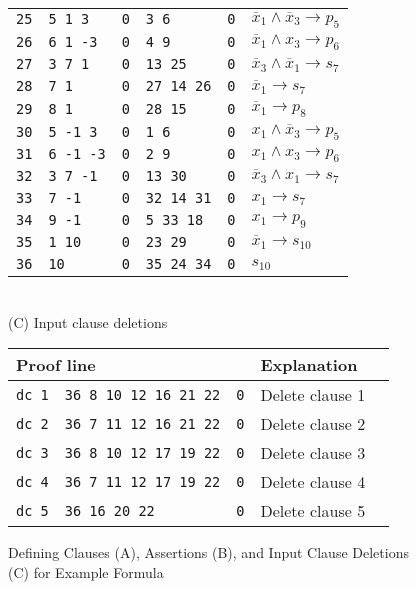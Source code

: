 \documentclass[letterpaper,USenglish,cleveref, autoref, thm-restate]{lipics-v2021}
\newcommand{\obar}[1]{\overline{#1}}
\begin{document}
\begin{figure}
\begin{minipage}{0.49\textwidth}
\begin{tabular}{llllll}
\midrule
\texttt{25} & \texttt{5 1 3} & \texttt{0} & \texttt{3 6} & \texttt{0} & $\obar{x}_1 \land \obar{x}_3 \rightarrow p_5$ \\
\texttt{26} & \texttt{6 1 -3} & \texttt{0} & \texttt{4 9} & \texttt{0} & $\obar{x}_1 \land x_3 \rightarrow p_6$ \\
\texttt{27} & \texttt{3 7 1} & \texttt{0} & \texttt{13 25} & \texttt{0} & $\obar{x}_3 \land \obar{x}_1 \rightarrow s_7$  \\
\texttt{28} & \texttt{7 1} & \texttt{0} & \texttt{27 14 26} & \texttt{0} & $\obar{x}_1 \rightarrow s_7$  \\
\texttt{29} & \texttt{8 1} & \texttt{0} & \texttt{28 15} & \texttt{0} & $\obar{x}_1 \rightarrow p_8$  \\
\texttt{30} & \texttt{5 -1 3} & \texttt{0} & \texttt{1 6} & \texttt{0} & $x_1 \land \obar{x}_3 \rightarrow p_5$ \\
\texttt{31} & \texttt{6 -1 -3} & \texttt{0} & \texttt{2 9} & \texttt{0} & $x_1 \land x_3 \rightarrow p_6$ \\
\texttt{32} & \texttt{3 7 -1} & \texttt{0} & \texttt{13 30} & \texttt{0} & $\obar{x}_3 \land x_1 \rightarrow s_7$  \\
\texttt{33} & \texttt{7 -1} & \texttt{0} & \texttt{32 14 31} & \texttt{0} & $x_1 \rightarrow s_7$  \\
\texttt{34} & \texttt{9 -1} & \texttt{0} & \texttt{5 33 18} & \texttt{0} & $x_1 \rightarrow p_9$  \\
\texttt{35} & \texttt{1 10} & \texttt{0} & \texttt{23 29} & \texttt{0} & $\obar{x}_1 \rightarrow s_{10}$  \\
\texttt{36} & \texttt{10} & \texttt{0} & \texttt{35 24 34} & \texttt{0} & $s_{10}$ \\
\bottomrule
\end{tabular}
\\[1.2ex]
(C) Input clause deletions\\[1.2ex]
\begin{tabular}{lllll}
  \toprule
 \multicolumn{3}{l}{Proof line} & Explanation\\
\midrule
 \texttt{dc 1} & \texttt{36 8 10 12 16 21 22} & \texttt{0} & Delete clause 1 \\
 \texttt{dc 2} & \texttt{36 7 11 12 16 21 22} & \texttt{0} & Delete clause 2 \\
 \texttt{dc 3} & \texttt{36 8 10 12 17 19 22} & \texttt{0} & Delete clause 3 \\
 \texttt{dc 4} & \texttt{36 7 11 12 17 19 22} & \texttt{0} & Delete clause 4 \\
 \texttt{dc 5} & \texttt{36 16 20 22} & \texttt{0} &  Delete clause 5 \\
\end{tabular}
\end{minipage}
\caption{Defining Clauses (A), Assertions (B), and Input Clause Deletions (C) for Example Formula}
\label{fig:eg4:proof}
\end{figure}
\end{document}
